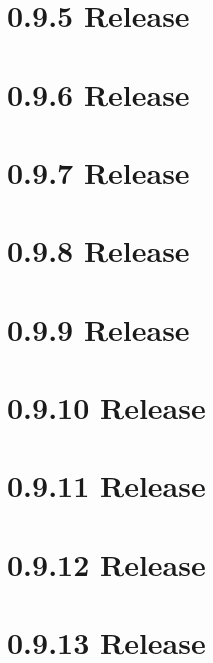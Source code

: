 \let\mypdfximage\pdfximage\def\pdfximage{\immediate\mypdfximage}\documentclass[twoside]{book}
\newcommand{\+}{\discretionary{\mbox{\scriptsize$\hookleftarrow$}}{}{}}
\begin{document}
\chapter{0.9.5 Release}
\label{doc_news_2021-04-12_0_9_5_md}

\chapter{0.9.6 Release}
\label{doc_news_2021-06-07_0_9_6_md}

\chapter{0.9.7 Release}
\label{doc_news_2021-07-09_0_9_7_md}

\chapter{0.9.8 Release}
\label{doc_news_2021-10-04_0_9_8_md}

\chapter{0.9.9 Release}
\label{doc_news_2022-03-10_0_9_9_md}

\chapter{0.9.10 Release}
\label{doc_news_2022-07-11_0_9_10_md}

\chapter{0.9.11 Release}
\label{doc_news_2022-10-05_0_9_11_md}

\chapter{0.9.12 Release}
\label{doc_news_2023-03-03_0_9_12_md}

\chapter{0.9.13 Release}
\label{doc_news_2023-03-14_0_9_13_md}

\end{document}
